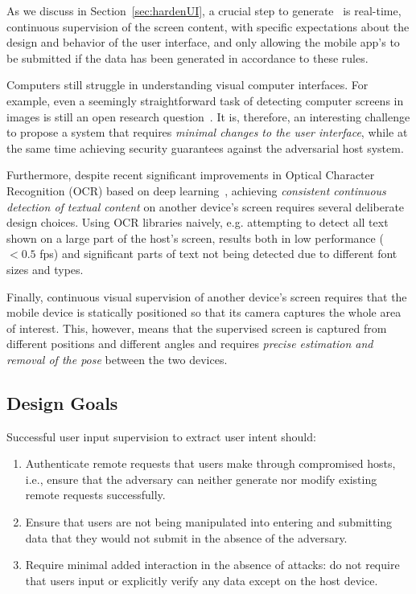 As we discuss in Section~\ref{sec:hardenUI}, a crucial step to generate \PsOI\ is real-time, continuous supervision of the screen content, with specific expectations about the design and behavior of the user interface, and only allowing the mobile app's \POI to be submitted if the data has been generated in accordance to these rules.




Computers still struggle in understanding visual computer interfaces.
For example, even a seemingly straightforward task of detecting computer screens in images is still an open research question~\cite{detectingScreens}.
It is, therefore, an interesting challenge to propose a system that requires \emph{minimal changes to the user interface}, while at the same time achieving security guarantees against the adversarial host system.

Furthermore, despite recent significant improvements in Optical Character Recognition (OCR) based on deep learning~\cite{tesseractOCR}, achieving \emph{consistent continuous detection of textual content} on another device's screen requires several deliberate design choices.
Using OCR libraries naively, e.g. attempting to detect all text shown on a large part of the host's screen, results both in low performance ($<0.5$ fps) and significant parts of text not being detected due to different font sizes and types.

Finally, continuous visual supervision of another device's screen requires that the mobile device is statically positioned so that its camera captures the whole area of interest.
This, however, means that the supervised screen is captured from different positions and different angles and requires \emph{precise estimation and removal of the pose} between the two devices.


\subsection{Design Goals}
Successful user input supervision to extract user intent should:

\begin{enumerate}
	\item Authenticate remote requests that users make through compromised hosts, i.e., ensure that the adversary can neither generate nor modify existing remote requests successfully.

	\item Ensure that users are not being manipulated into entering and submitting data that they would not submit in the absence of the adversary.

	\item Require minimal added interaction in the absence of attacks: do not require that users input or explicitly verify any data except on the host device.
\end{enumerate}
